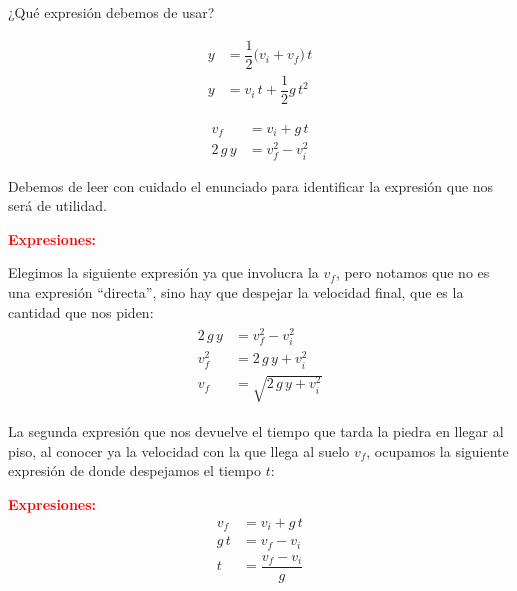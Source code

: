 \documentclass[14pt]{extarticle}
\newcommand{\textocolor}[2]{\textbf{\textcolor{#1}{#2}}}
\begin{document}
\vspace*{0.5cm}
¿Qué expresión debemos de usar?

\vspace*{-1cm}
\begin{minipage}[t]{0.4\linewidth}
\begin{align*}
y &= \dfrac{1}{2} \big( v_{i} + v_{f} \big) \, t  \\[0.5em]
y &= v_{i} \, t + \dfrac{1}{2} g \, t^{2}
\end{align*}
\end{minipage}
\begin{minipage}[t]{0.4\linewidth}
\begin{align*}
v_{f} &= v_{i} + g \, t \\[0.5em]
2 \, g \, y &= v_{f}^{2} - v_{i}^{2} 
\end{align*}
\end{minipage}

Debemos de leer con cuidado el enunciado para identificar la expresión que nos será de utilidad.

\vspace*{0.5cm}
\noindent
\textocolor{red}{Expresiones:}

\noindent
Elegimos la siguiente expresión ya que involucra la $v_{f}$, pero notamos que no es una expresión \enquote{directa}, sino hay que despejar la velocidad final, que es la cantidad que nos piden:
\begin{eqnarray*}
\begin{aligned}
2 \, g \, y &= v_{f}^{2} - v_{i}^{2} \\[0.35em] 
v_{f}^{2} &= 2 \, g \, y + v_{i}^{2} \\[0.35em] 
v_{f} &= \sqrt{2 \, g \, y + v_{i}^{2}} 
\end{aligned}
\end{eqnarray*}

La segunda expresión que nos devuelve el tiempo que tarda la piedra en llegar al piso, al conocer ya la velocidad con la que llega al suelo $v_{f}$, ocupamos la siguiente expresión de donde despejamos el tiempo $t$:

\vspace*{0.5cm}
\noindent
\textocolor{red}{Expresiones:}
\begin{align*}
v_{f} &= v_{i} + g \, t \\[0.5em] 
g \, t &= v_{f} - v_{i} \\[0.5em] 
t &= \dfrac{v_{f} - v_{i}}{g}
\end{align*}
\end{document}
